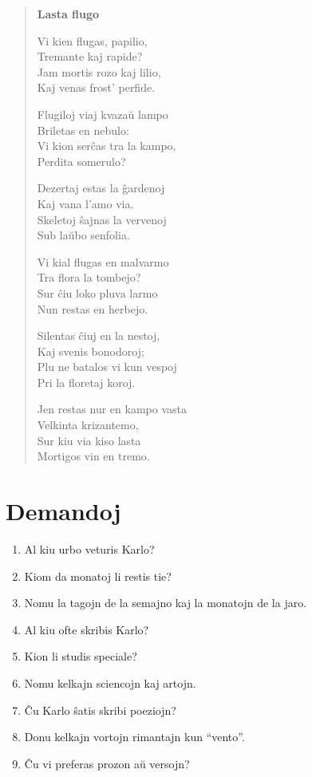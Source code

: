 \begin{verse}
\textbf{Lasta flugo}

Vi kien flugas, papilio,\\
\vin Tremante kaj rapide?\\
Jam mortis rozo kaj lilio,\\
\vin Kaj venas frost' perfide.

Flugiloj viaj kvazaŭ lampo\\
\vin Briletas en nebulo:\\
Vi kion serĉas tra la kampo,\\
\vin Perdita somerulo?

Dezertaj estas la ĝardenoj\\
\vin Kaj vana l'amo via.\\
Skeletoj ŝajnas la vervenoj\\
\vin Sub laŭbo senfolia.

Vi kial flugas en malvarmo\\
\vin Tra flora la tombejo?\\
Sur ĉiu loko pluva larmo\\
\vin Nun restas en herbejo.

\newpage

Silentas ĉiuj en la nestoj,\\
\vin Kaj svenis bonodoroj;\\
Plu ne batalos vi kun vespoj\\
\vin Pri la floretaj koroj.

Jen restas nur en kampo vasta\\
\vin Velkinta krizantemo,\\
Sur kiu via kiso lasta\\
\vin Mortigos vin en tremo.
\end{verse}

\newpage

\section*{Demandoj}

\begin{enumerate}
    \item  Al kiu urbo veturis Karlo?
    \item  Kiom da monatoj li restis tie?
    \item  Nomu la tagojn de la semajno kaj la monatojn de la jaro.
    \item  Al kiu ofte skribis Karlo?
    \item  Kion li studis speciale?
    \item  Nomu kelkajn sciencojn kaj artojn.
    \item  Ĉu Karlo ŝatis skribi poeziojn?
    \item  Donu kelkajn vortojn rimantajn kun ``vento''.
    \item  Ĉu vi preferas prozon aŭ versojn?
\end{enumerate}

